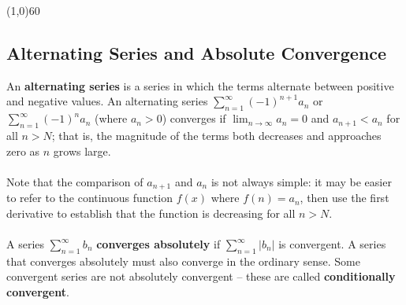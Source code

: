\documentclass[10.5pt,twoside]{report}
\theoremstyle{definition}
\begin{document}
\line(1,0){60}
\linethickness{0.5mm}

\subsection{Alternating Series and Absolute Convergence}

An \textbf{alternating series} is a series in which the terms alternate between positive and negative values.  An alternating series $ \sum_{n=1}^{\infty} (-1)^{n+1} a_n$ or $ \sum_{n=1}^{\infty} (-1)^{n} a_n$ (where $a_n>0$) converges if $ \lim_{n\to \infty} a_n =0$ and $a_{n+1}<a_n$ for all $n>N$; that is, the magnitude of the terms both decreases and approaches zero as $n$ grows large.\\
${}$\\
Note that the comparison of $a_{n+1}$ and $a_{n}$ is not always simple:  it may be easier to refer to the continuous function $f(x)$ where $f(n)=a_n$, then use the first derivative to establish that the function is decreasing for all $n>N$.\\
${}$\\
A series $ \sum_{n=1}^{\infty} b_n$  \textbf{converges absolutely} if $ \sum_{n=1}^{\infty} |b_n|$ is convergent.  A series that converges absolutely must also converge in the ordinary sense.  Some convergent series are not absolutely convergent -- these are called \textbf{conditionally convergent}.\\
${}$\\
\end{document}
